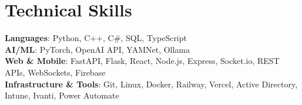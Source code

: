 \documentclass[letterpaper,11pt]{article}
\begin{document}
\section{Technical Skills}
 \begin{itemize}[leftmargin=0.15in, label={}]
    \small{\item{
     \textbf{Languages}{: Python, C++, C\#, SQL, TypeScript} \\
     \textbf{AI/ML}{: PyTorch, OpenAI API, YAMNet, Ollama} \\
     \textbf{Web \& Mobile}{: FastAPI, Flask, React, Node.js, Express, Socket.io, REST APIs, WebSockets, Firebase} \\
     \textbf{Infrastructure \& Tools}{: Git, Linux, Docker, Railway, Vercel, Active Directory, Intune, Ivanti, Power Automate}
    }}
 \end{itemize}

\end{document}
